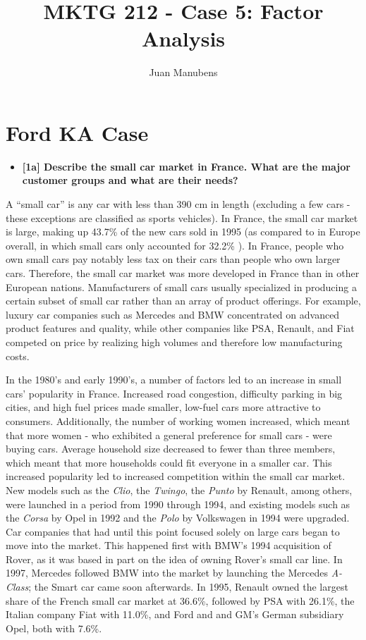 \documentclass[10pt, oneside,spanish]{article}
\title{MKTG 212 - Case 5: Factor Analysis} \lstset{language=R}
\author[]{Juan Manubens}
\affil[]{University of Pennsylvania}
\date{}
\begin{document}
\maketitle



\section{Ford KA Case}


\begin{itemize}
\item \textbf{[1a] Describe the small car market in France.  What are the major customer groups and what are their needs?  }
\end{itemize}

A “small car” is any car with less than 390 cm in length (excluding a few cars - these exceptions are classified as sports vehicles).  In France, the small car market is large, making up 43.7\% of the new cars sold in 1995 (as compared to in Europe overall, in which small cars only accounted for 32.2\% ).  In France, people who own small cars pay notably less tax on their cars than people who own larger cars.  Therefore, the small car market was more developed in France than in other European nations.  Manufacturers of small cars usually specialized in producing a certain subset of small car rather than an array of product offerings.  For example, luxury car companies such as Mercedes and BMW concentrated on advanced product features and quality, while other companies like PSA, Renault, and Fiat competed on price by realizing high volumes and therefore low manufacturing costs.

In the 1980's and early 1990's, a number of factors led to an increase in small cars' popularity in France.  Increased road congestion, difficulty parking in big cities, and high fuel prices made smaller, low-fuel cars more attractive to consumers.  Additionally, the number of working women increased, which meant that more women - who exhibited a general preference for small cars - were buying cars.  Average household size decreased to fewer than three members, which meant that more households could fit everyone in a smaller car.  This increased popularity led to increased competition within the small car market.  New models such as the \textit{Clio}, the \textit{Twingo}, the \textit{Punto} by Renault, among others, were launched in a period from 1990 through 1994, and existing models such as the \textit{Corsa} by Opel in 1992 and the \textit{Polo} by Volkswagen in 1994 were upgraded.  Car companies that had until this point focused solely on large cars began to move into the market.  This happened first with BMW’s 1994 acquisition of Rover, as it was based in part on the idea of owning Rover's small car line.  In 1997, Mercedes followed BMW into the market by launching the Mercedes \textit{A-Class}; the Smart car came soon afterwards.  In 1995, Renault owned the largest share of the French small car market at 36.6\%, followed by PSA with 26.1\%, the Italian company Fiat with 11.0\%, and Ford and and GM's German subsidiary Opel, both with 7.6\%.    
\end{document}
